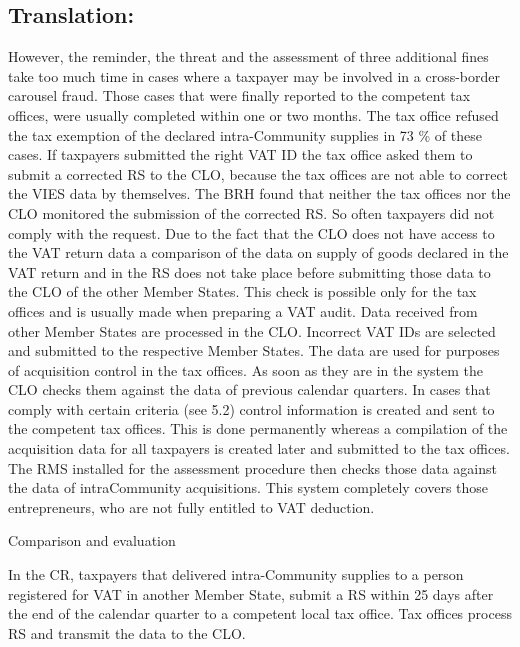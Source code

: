\documentclass[10pt]{article}
\begin{document}
\pagebreak

\subsection*{Translation:}

However, the reminder, the threat and the assessment of three additional fines take too much time in cases where a taxpayer may be involved in a cross-border carousel fraud.
Those cases that were finally reported to the competent tax offices, were usually completed within one or two months.
The tax office refused the tax exemption of the declared intra-Community supplies in 73 \% of these cases.
If taxpayers submitted the right VAT ID the tax office asked them to submit a corrected RS to the CLO, because the tax offices are not able to correct the VIES data by themselves.
The BRH found that neither the tax offices nor the CLO monitored the submission of the corrected RS. So often taxpayers did not comply with the request.
Due to the fact that the CLO does not have access to the VAT return data a comparison of the data on supply of goods declared in the VAT return and in the RS does not take place before submitting those data to the CLO of the other Member States.
This check is possible only for the tax offices and is usually made when preparing a VAT audit.
Data received from other Member States are processed in the CLO.
Incorrect VAT IDs are selected and submitted to the respective Member States.
The data are used for purposes of acquisition control in the tax offices.
As soon as they are in the system the CLO checks them against the data of previous calendar quarters.
In cases that comply with certain criteria (see 5.2) control information is created and sent to the competent tax offices.
This is done permanently whereas a compilation of the acquisition data for all taxpayers is created later and submitted to the tax offices.
The RMS installed for the assessment procedure then checks those data against the data of intraCommunity acquisitions.
This system completely covers those entrepreneurs, who are not fully entitled to VAT deduction.


Comparison and evaluation

In the CR, taxpayers that delivered intra-Community supplies to a person registered for VAT in another Member State, submit a RS within 25 days after the end of the calendar quarter to a competent local tax office.
Tax offices process RS and transmit the data to the CLO.
\end{document}
